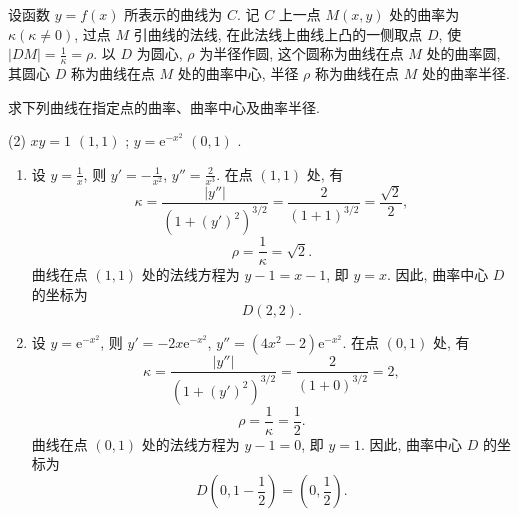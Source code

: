 \begin{solution}
\begin{enumerate}
    \end{enumerate}
\end{solution}

\begin{exercise}[3.5.11]
    设函数 $y = f(x)$ 所表示的曲线为 $C$. 记 $C$ 上一点 $M(x, y)$ 处的曲率为 $\kappa (\kappa \ne 0)$, 过点 $M$ 引曲线的法线, 在此法线上曲线上凸的一侧取点 $D$, 使 $|DM| = \frac{1}{\kappa} = \rho$. 以 $D$ 为圆心, $\rho$ 为半径作圆, 这个圆称为曲线在点 $M$ 处的曲率圆, 其圆心 $D$ 称为曲线在点 $M$ 处的曲率中心, 半径 $\rho$ 称为曲线在点 $M$ 处的曲率半径.

    求下列曲线在指定点的曲率、曲率中心及曲率半径.
    \begin{tasks}(2)
        \task $xy = 1$  $(1, 1)$ ;
        \task $y = \mathrm{e}^{-x^2}$  $(0, 1)$ .
    \end{tasks}
\end{exercise}

\begin{solution}
    \begin{enumerate}
        \item 设 $y = \frac{1}{x}$, 则 $y' = -\frac{1}{x^2}$, $y'' = \frac{2}{x^3}$. 在点 $(1, 1)$ 处, 有
              $$\kappa = \frac{|y''|}{(1 + (y')^2)^{3/2}} = \frac{2}{(1 + 1)^{3/2}} = \frac{\sqrt{2}}{2},$$
              $$\rho = \frac{1}{\kappa} = \sqrt{2}.$$
              曲线在点 $(1, 1)$ 处的法线方程为 $y - 1 = x - 1$, 即 $y = x$. 因此, 曲率中心 $D$ 的坐标为
              $$D\left(2, 2\right).$$
        \item 设 $y = \mathrm{e}^{-x^2}$, 则 $y' = -2x \mathrm{e}^{-x^2}$, $y'' = (4x^2 - 2) \mathrm{e}^{-x^2}$. 在点 $(0, 1)$ 处, 有
              $$\kappa = \frac{|y''|}{(1 + (y')^2)^{3/2}} = \frac{2}{(1 + 0)^{3/2}} = 2,$$
              $$\rho = \frac{1}{\kappa} = \frac{1}{2}.$$
              曲线在点 $(0, 1)$ 处的法线方程为 $y - 1 = 0$, 即 $y = 1$. 因此, 曲率中心 $D$ 的坐标为
              $$D\left(0, 1 - \frac{1}{2}\right) = (0, \frac{1}{2}).$$
    \end{enumerate}
\end{solution}

